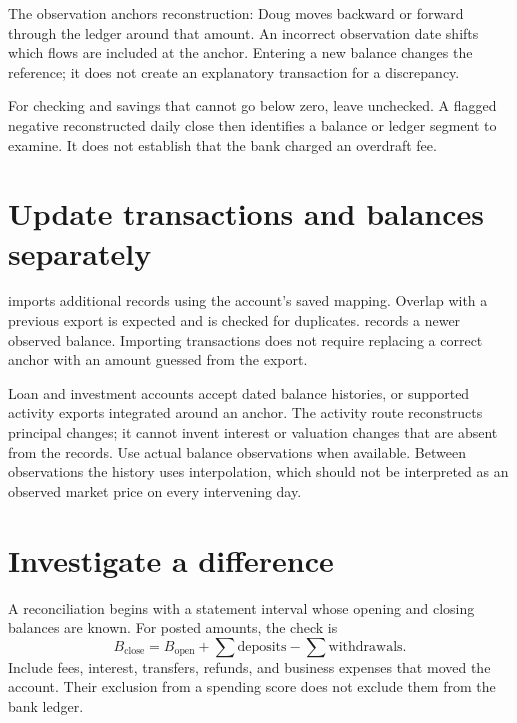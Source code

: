 The observation anchors reconstruction: Doug moves backward or forward through the ledger around that amount. An incorrect observation date shifts which flows are included at the anchor. Entering a new balance changes the reference; it does not create an explanatory transaction for a discrepancy.

For checking and savings that cannot go below zero, leave  unchecked. A flagged negative reconstructed daily close then identifies a balance or ledger segment to examine. It does not establish that the bank charged an overdraft fee.

\section{Update transactions and balances separately}
 imports additional records using the account's saved mapping. Overlap with a previous export is expected and is checked for duplicates.  records a newer observed balance. Importing transactions does not require replacing a correct anchor with an amount guessed from the export.

Loan and investment accounts accept dated balance histories, or supported activity exports integrated around an anchor. The activity route reconstructs principal changes; it cannot invent interest or valuation changes that are absent from the records. Use actual balance observations when available. Between observations the history uses interpolation, which should not be interpreted as an observed market price on every intervening day.

\section{Investigate a difference}\label{sec:reconcile}
A reconciliation begins with a statement interval whose opening and closing balances are known. For posted amounts, the check is
\begin{equation}
 B_{\mathrm{close}}=B_{\mathrm{open}}+\sum\text{deposits}-\sum\text{withdrawals}.
\end{equation}
Include fees, interest, transfers, refunds, and business expenses that moved the account. Their exclusion from a spending score does not exclude them from the bank ledger.

